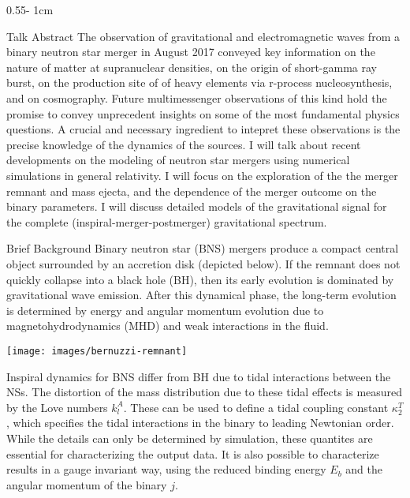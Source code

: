 \documentclass{../psuposter}
\begin{document}
\begin{frame}
\begin{columns}
\begin{column}{0.55\textwidth - 1cm}
    \begin{block}{Talk Abstract}
        The observation of gravitational and electromagnetic waves from a binary neutron star merger in August 2017 conveyed key information on the nature of matter at supranuclear densities, on the origin of short-gamma ray burst, on the production site of of heavy elements via r-process nucleosynthesis, and on cosmography. Future multimessenger observations of this kind hold the promise to convey unprecedent insights on some of the most fundamental physics questions. A crucial and necessary ingredient to intepret these observations is the precise knowledge of the dynamics of the sources. I will talk about recent developments on the modeling of neutron star mergers using numerical simulations in general relativity. I will focus on the exploration of the the merger remnant and mass ejecta, and the dependence of the merger outcome on the binary parameters. I will discuss detailed models of the gravitational signal for the complete (inspiral-merger-postmerger) gravitational spectrum.    
    \end{block}


    \begin{block}{Brief Background}
        Binary neutron star (BNS) mergers produce a compact central object surrounded by an accretion disk (depicted below). If the remnant does not quickly collapse into a black hole (BH), then its early evolution is dominated by gravitational wave emission. After this dynamical phase, the long-term evolution is determined by energy and angular momentum evolution due to magnetohydrodynamics (MHD) and weak interactions in the fluid.
        \cite{bernuzziNeutronStarMerger2020}
        \begin{center}
	    	\texttt{[image: images/bernuzzi-remnant]}    		
    	\end{center}
		Inspiral dynamics for BNS differ from BH due to tidal interactions between the NSs. The distortion of the mass distribution due to these tidal effects is measured by the Love numbers $k_l^A$. These can be used to define a tidal coupling constant $\kappa_2^T$, which specifies the tidal interactions in the binary to leading Newtonian order. While the details can only be determined by simulation, these quantites are essential for characterizing the output data. It is also possible to characterize results in a gauge invariant way, using the reduced binding energy $E_b$ and the angular momentum of the binary $j$.
        \cite{bernuzziNeutronStarMerger2020}


\end{block}
\end{column}
\end{columns}
\end{frame}
\end{document}
